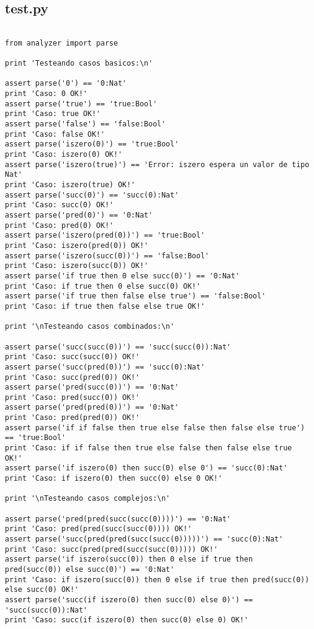 \subsection{test.py}

\begin{verbatim}

from analyzer import parse

print 'Testeando casos basicos:\n'

assert parse('0') == '0:Nat'
print 'Caso: 0 OK!'
assert parse('true') == 'true:Bool'
print 'Caso: true OK!'
assert parse('false') == 'false:Bool'
print 'Caso: false OK!'
assert parse('iszero(0)') == 'true:Bool'
print 'Caso: iszero(0) OK!'
assert parse('iszero(true)') == 'Error: iszero espera un valor de tipo Nat'
print 'Caso: iszero(true) OK!'
assert parse('succ(0)') == 'succ(0):Nat'
print 'Caso: succ(0) OK!'
assert parse('pred(0)') == '0:Nat'
print 'Caso: pred(0) OK!'
assert parse('iszero(pred(0))') == 'true:Bool'
print 'Caso: iszero(pred(0)) OK!'
assert parse('iszero(succ(0))') == 'false:Bool'
print 'Caso: iszero(succ(0)) OK!'
assert parse('if true then 0 else succ(0)') == '0:Nat'
print 'Caso: if true then 0 else succ(0) OK!'
assert parse('if true then false else true') == 'false:Bool'
print 'Caso: if true then false else true OK!'

print '\nTesteando casos combinados:\n'

assert parse('succ(succ(0))') == 'succ(succ(0)):Nat'
print 'Caso: succ(succ(0)) OK!'
assert parse('succ(pred(0))') == 'succ(0):Nat'
print 'Caso: succ(pred(0)) OK!'
assert parse('pred(succ(0))') == '0:Nat'
print 'Caso: pred(succ(0)) OK!'
assert parse('pred(pred(0))') == '0:Nat'
print 'Caso: pred(pred(0)) OK!'
assert parse('if if false then true else false then false else true') == 'true:Bool'
print 'Caso: if if false then true else false then false else true OK!'
assert parse('if iszero(0) then succ(0) else 0') == 'succ(0):Nat'
print 'Caso: if iszero(0) then succ(0) else 0 OK!'

print '\nTesteando casos complejos:\n'

assert parse('pred(pred(succ(succ(0))))') == '0:Nat'
print 'Caso: pred(pred(succ(succ(0)))) OK!'
assert parse('succ(pred(pred(succ(succ(0)))))') == 'succ(0):Nat'
print 'Caso: succ(pred(pred(succ(succ(0))))) OK!'
assert parse('if iszero(succ(0)) then 0 else if true then pred(succ(0)) else succ(0)') == '0:Nat'
print 'Caso: if iszero(succ(0)) then 0 else if true then pred(succ(0)) else succ(0) OK!'
assert parse('succ(if iszero(0) then succ(0) else 0)') == 'succ(succ(0)):Nat'
print 'Caso: succ(if iszero(0) then succ(0) else 0) OK!'


\end{verbatim}
